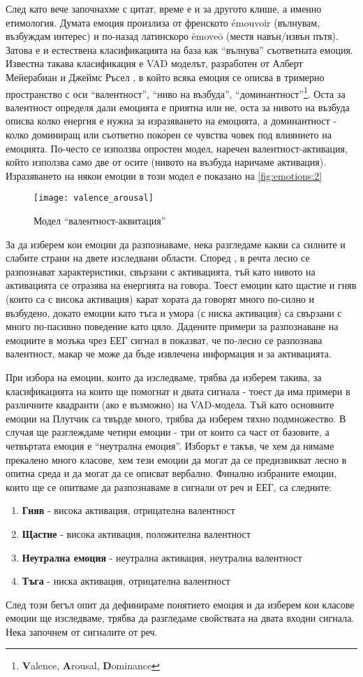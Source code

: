 \documentclass[main.tex]{subfiles}
\begin{document}
След като вече започнахме с цитат, време е и за другото клише, а именно етимология. Думата емоция произлиза от френското émouvoir (вълнувам, възбуждам интерес) и по-назад латинскоро ēmoveō (местя навън/извън пътя). Затова е и естествена класификацията на база как ``вълнува'' съответната емоция. Известна такава класификация е VAD моделът, разработен от Алберт Мейерабиан и Джеймс Ръсел \cite{pad}, в който всяка емоция се описва в тримерно пространство с оси ``валентност'', ``ниво на възбуда'', ``доминантност''\footnote{\textbf{V}alence, \textbf{A}rousal, \textbf{D}ominance}. Оста за валентност определя дали емоцията е приятна или не, оста за нивото на възбуда описва колко енергия е нужна за изразяването на емоцията, а доминантност - колко доминиращ или съответно пок\`{о}рен се чувства човек под влиянието на емоцията. По-често се използва опростен модел, наречен валентност-активация, който използва само две от осите (нивото на възбуда наричаме активация). Изразяването на някои емоции в този модел е показано на \autoref{fig:emotions:2}
\begin{figure}[ht]%
    \centering
    \texttt{[image: valence\_arousal]}
    \caption{Модел ``валентност-аквитация''}
    \label{fig:emotions:2}
\end{figure}

За да изберем кои емоции да разпознаваме, нека разгледаме какви са силните и слабите страни на двете изследвани области.
Според \cite{survey}, в речта лесно се разпознават характеристики, свързани с активацията, тъй като нивото на активацията се отразява на енергията на говора. Тоест емоции като щастие и гняв (които са с висока активация) карат хората да говорят много по-силно и възбудено, докато емоции като тъга и умора (с ниска активация) са свързани с много по-пасивно поведение като цяло.
Дадените примери за разпознаване на емоциите в мозъка чрез ЕЕГ сигнал в \cite{brain_survey} показват, че по-лесно се разпознава валентност, макар че може да бъде извлечена информация и за активацията.

При избора на емоции, които да изследваме, трябва да изберем такива, за класификацията на които ще помогнат и двата сигнала - тоест да има примери в различните квадранти (ако е възможно) на VAD-модела. Тъй като основните емоции на Плутчик са твърде много, трябва да изберем тяхно подмножество. В случая ще разглеждаме четири емоции - три от които са част от базовите, а четвъртата емоция е ``неутрална емоция''. Изборът е такъв, че хем да нямаме прекалено много класове, хем тези емоции да могат да се предизвикват лесно в опитна среда и да могат да се описват вербално.
Финално избраните емоции, които ще се опитваме да разпознаваме в сигнали от реч и ЕЕГ, са следните:
\begin{enumerate}
    \item \textbf{Гняв} - висока активация, отрицателна валентност
    \item \textbf{Щастие} - висока активация, положителна валентност
    \item \textbf{Неутрална емоция} - неутрална активация, неутрална валентност
    \item \textbf{Тъга} - ниска активация, отрицателна валентност
\end{enumerate}

След този бегъл опит да дефинираме понятието емоция и да изберем кои класове емоции ще изследваме, трябва да разгледаме свойствата на двата входни сигнала. Нека започнем от сигналите от реч. 
\end{document}
